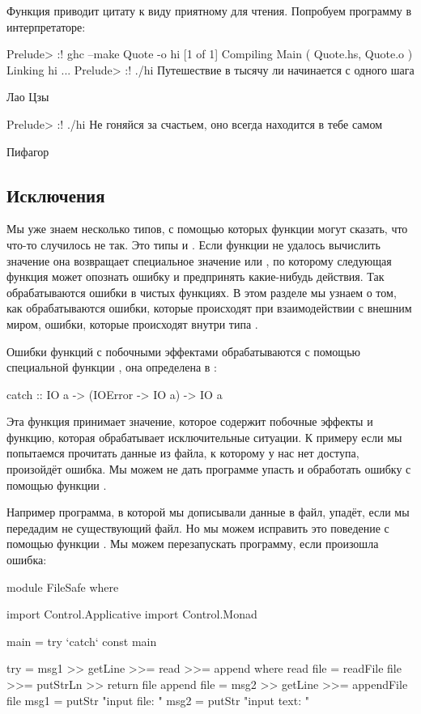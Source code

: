 Функция  приводит цитату к виду приятному для чтения.
Попробуем программу в интерпретаторе:

\begin{code}
Prelude> :! ghc --make Quote -o hi
[1 of 1] Compiling Main             ( Quote.hs, Quote.o )
Linking hi ...
Prelude> :! ./hi
Путешествие в тысячу ли начинается с одного шага

Лао Цзы


Prelude> :! ./hi
Не гоняйся за счастьем, оно всегда находится в тебе самом

Пифагор
\end{code}


\subsection{Исключения}

Мы уже знаем несколько типов, с помощью которых функции
могут сказать, что что-то случилось не так. Это типы 
 и . Если функции не удалось вычислить
значение она возвращает специальное значение 
или , по которому следующая функция
может опознать ошибку и предпринять какие-нибудь действия.
Так обрабатываются ошибки в чистых функциях.
В этом разделе мы узнаем о том, как обрабатываются 
ошибки, которые происходят при взаимодействии с
внешним миром, ошибки, которые происходят внутри
типа . 

Ошибки функций с побочными эффектами обрабатываются
с помощью специальной функции , она определена 
в :

\begin{code}
catch :: IO a -> (IOError -> IO a) -> IO a
\end{code}

Эта функция принимает значение, которое содержит побочные
эффекты и функцию, которая обрабатывает исключительные 
ситуации. К примеру если мы попытаемся прочитать данные
из файла, к которому у нас нет доступа, произойдёт ошибка.
Мы можем не дать программе упасть и обработать ошибку
с помощью функции .

Например программа, в которой мы дописывали данные в
файл, упадёт, если мы передадим не существующий файл.
Но мы можем исправить это поведение с помощью функции
. Мы можем перезапускать программу, если произошла
ошибка:

\begin{code}
module FileSafe where

import Control.Applicative
import Control.Monad

main = try `catch` const main

try = msg1 >> getLine >>= read >>= append
    where read   file = readFile file >>= putStrLn >> return file
          append file = msg2 >> getLine >>= appendFile file
          msg1        = putStr "input file: "
          msg2        = putStr "input text: "
\end{code}

